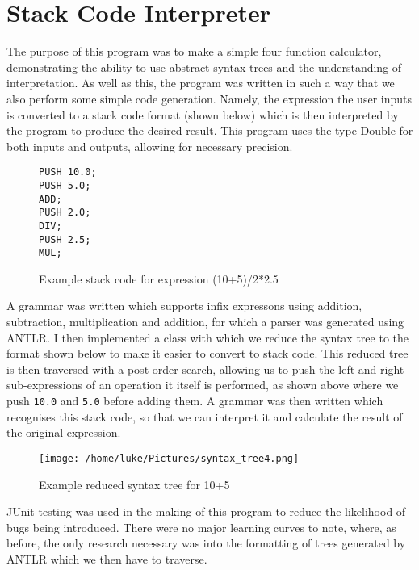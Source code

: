 \documentclass[a4paper, 11pt]{article}
\begin{document}
\clearpage
\section{Stack Code Interpreter}
The purpose of this program was to make a simple four function calculator, demonstrating the ability to use abstract syntax trees and the understanding of interpretation. As well as this, the program was written in such a way that we also perform some simple code generation. Namely, the expression the user inputs is converted to a stack code format (shown below) which is then interpreted by the program to produce the desired result. This program uses the type Double for both inputs and outputs, allowing for necessary precision.

\begin{figure}[H]
\centering
\begin{BVerbatim}
PUSH 10.0;
PUSH 5.0;
ADD;
PUSH 2.0;
DIV;
PUSH 2.5;
MUL;
\end{BVerbatim}
\caption{Example stack code for expression (10+5)/2*2.5}
\end{figure}

\noindent A grammar was written which supports infix expressons using addition, subtraction, multiplication and addition, for which a parser was generated using ANTLR. I then implemented a class with which we reduce the syntax tree to the format shown below to make it easier to convert to stack code. This reduced tree is then traversed with a post-order search, allowing us to push the left and right sub-expressions of an operation it itself is performed, as shown above where we push \texttt{10.0} and \texttt{5.0} before adding them. A grammar was then written which recognises this stack code, so that we can interpret it and calculate the result of the original expression. 

\begin{figure}[ht!]
	\centering
	\texttt{[image: /home/luke/Pictures/syntax\_tree4.png]}
	{\caption{Example reduced syntax tree for 10+5}}
\end{figure}

\noindent JUnit testing was used in the making of this program to reduce the likelihood of bugs being introduced. There were no major learning curves to note, where, as before, the only research necessary was into the formatting of trees generated by ANTLR which we then have to traverse. 

\clearpage
\end{document}
